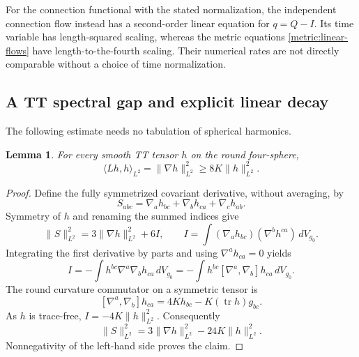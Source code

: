 \documentclass[11pt]{article}
\numberwithin{equation}{section}
\newtheorem{lemma}[theorem]{Lemma}
\theoremstyle{definition}
\theoremstyle{remark}
\begin{document}
For the connection functional with the stated normalization, the independent
connection flow instead has a second-order linear equation for
$q=Q-I$. Its time variable has length-squared scaling, whereas the
metric equations \eqref{metric:linear-flows} have length-to-the-fourth
scaling. Their numerical rates are not directly comparable without a
choice of time normalization.

\subsection{A TT spectral gap and explicit linear decay}
\label{subsec:metric-gap}

The following estimate needs no tabulation of spherical harmonics.

\begin{lemma}\label{lem:metric-TT-gap}
For every smooth TT tensor $h$ on the round four-sphere,
\begin{equation}\label{metric:TT-gap}
 \langle Lh,h\rangle_{L^2}=\|\nabla h\|_{L^2}^2
 \geq 8K\|h\|_{L^2}^2.
\end{equation}
\end{lemma}

\begin{proof}
Define the fully symmetrized covariant derivative, without averaging, by
\[
 S_{abc}=\nabla_a h_{bc}+\nabla_b h_{ca}+\nabla_c h_{ab}.
\]
Symmetry of $h$ and renaming the summed indices give
\[
 \|S\|_{L^2}^2=3\|\nabla h\|_{L^2}^2+6I,
 \qquad I=\int (\nabla_a h_{bc})(\nabla^b h^{ca})\,dV_{g_0}.
\]
Integrating the first derivative by parts and using
$\nabla^a h_{ca}=0$ yields
\[
 I=-\int h^{bc}\nabla^a\nabla_b h_{ca}\,dV_{g_0}
   =-\int h^{bc}[\nabla^a,\nabla_b]h_{ca}\,dV_{g_0}.
\]
The round curvature commutator on a symmetric tensor is
\[
 [\nabla^a,\nabla_b]h_{ca}
 =4Kh_{bc}-K(\operatorname{tr}h)g_{bc}.
\]
As $h$ is trace-free, $I=-4K\|h\|_{L^2}^2$. Consequently
\begin{equation}\label{metric:symmetrized-derivative-identity}
 \|S\|_{L^2}^2
 =3\|\nabla h\|_{L^2}^2-24K\|h\|_{L^2}^2.
\end{equation}
Nonnegativity of the left-hand side proves the claim.
\end{proof}
\end{document}

